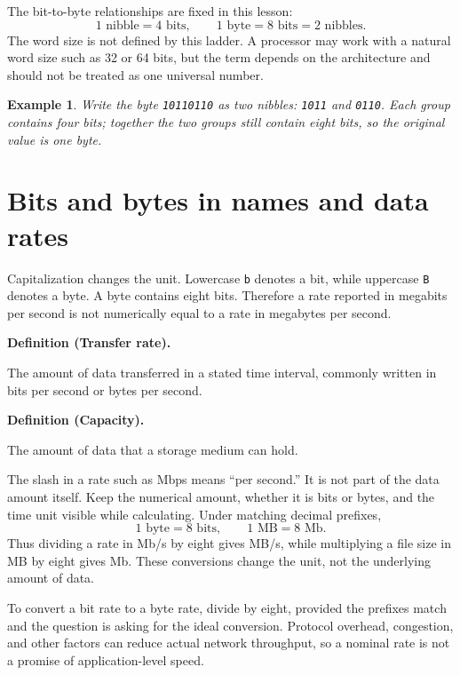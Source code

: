 \documentclass[11pt]{article}
\newtheorem{example}{Example}[section]
\newenvironment{definitionbox}[1]{%
  \par\noindent\textbf{Definition (#1).}\ \itshape
}{\par\vspace{0.3em}}
\begin{document}
The bit-to-byte relationships are fixed in this lesson:
\[
  1\text{ nibble}=4\text{ bits},\qquad
  1\text{ byte}=8\text{ bits}=2\text{ nibbles}.
\]
The word size is not defined by this ladder. A processor may work with a
natural word size such as 32 or 64 bits, but the term depends on the
architecture and should not be treated as one universal number.

\begin{example}
Write the byte \texttt{10110110} as two nibbles: \texttt{1011} and
\texttt{0110}. Each group contains four bits; together the two groups still
contain eight bits, so the original value is one byte.
\end{example}

\section{Bits and bytes in names and data rates}
Capitalization changes the unit. Lowercase \texttt{b} denotes a bit, while
uppercase \texttt{B} denotes a byte. A byte contains eight bits. Therefore a
rate reported in megabits per second is not numerically equal to a rate in
megabytes per second.

\begin{definitionbox}{Transfer rate}
The amount of data transferred in a stated time interval, commonly written
in bits per second or bytes per second.
\end{definitionbox}

\begin{definitionbox}{Capacity}
The amount of data that a storage medium can hold.
\end{definitionbox}

The slash in a rate such as Mbps means ``per second.'' It is not part of the
data amount itself. Keep the numerical amount, whether it is bits or bytes,
and the time unit visible while calculating. Under matching decimal prefixes,
\[
  1\text{ byte}=8\text{ bits},\qquad
  1\text{ MB}=8\text{ Mb}.
\]
Thus dividing a rate in Mb/s by eight gives MB/s, while multiplying a file
size in MB by eight gives Mb. These conversions change the unit, not the
underlying amount of data.

To convert a bit rate to a byte rate, divide by eight, provided the prefixes
match and the question is asking for the ideal conversion. Protocol overhead,
congestion, and other factors can reduce actual network throughput, so a
nominal rate is not a promise of application-level speed.
\end{document}
